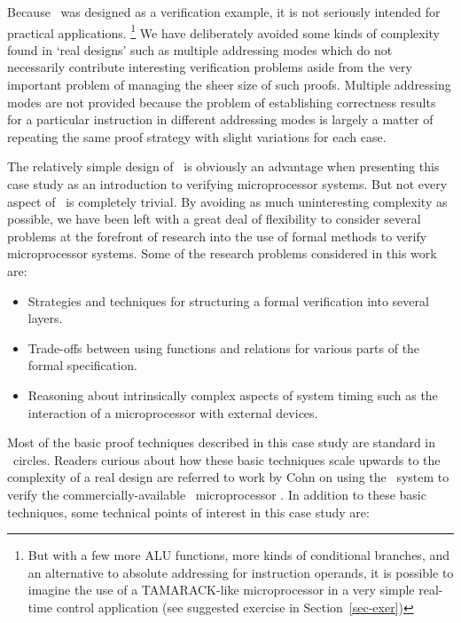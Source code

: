 Because
\Tamarack\ was designed as a verification example,
it is not seriously intended for practical applications.
\footnote{
But with a few more ALU functions,
more kinds of conditional branches, and
an alternative to absolute addressing for instruction operands,
it is possible to imagine the use
of a \mbox{\scriptsize TAMARACK}-like microprocessor in a very simple
real-time control application
(see suggested exercise in Section~\ref{sec-exer})}
We have deliberately avoided
some kinds of complexity found in `real designs' such
as multiple addressing modes
which do not necessarily contribute
interesting verification problems aside from the
very important problem of managing the sheer size of such proofs.
Multiple addressing modes are not provided because the problem of
establishing correctness results for a particular instruction
in different addressing modes is largely a matter of repeating
the same proof strategy with slight variations for each case.

The relatively simple design of \Tamarack\
is obviously an advantage when presenting this case study
as an introduction to verifying microprocessor systems.
But not every aspect of \Tamarack\ is completely trivial.
By avoiding as much uninteresting complexity as possible,
we have been left with a great deal of flexibility
to consider several problems at the forefront of
research into the use of formal methods
to verify microprocessor systems.
Some of the research problems considered in this work are:

\begin{itemize}
\item
Strategies
and techniques for structuring a formal verification into several layers.
\item
Trade-offs between using functions and relations for various parts
of the formal specification.
\item
Reasoning about
intrinsically complex aspects of system timing such as
the interaction of a microprocessor with external devices.
\end{itemize}

Most of the
basic proof techniques described in this case study
are standard in \HOL\ circles.
Readers curious about how these basic techniques scale upwards
to the complexity of a real design are referred to
work by Cohn \cite{Cohn:calgary86,Cohn:banff87,Cohn:jar}
on using the \HOL\ system to verify the commercially-available
\Viper\ microprocessor \cite{Cullyer:lncs331}.
In addition to these basic techniques,
some technical points of interest in this case study are:


